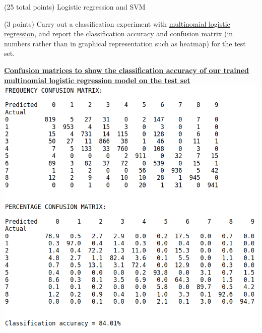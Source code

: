 \documentclass[12pt]{article}
\begin{document}
\begin{question}{(25 total points) Logistic regression and SVM}

  


  \medskip
   \begin{subquestion}{(3 points)
       Carry out a classification experiment with
       \href{https://scikit-learn.org/0.19/modules/generated/sklearn.linear\_model.LogisticRegression.html}{multinomial logistic regression},
       and report the classification accuracy and confusion matrix (in
       numbers rather than in graphical representation such as heatmap)
       for the test set.
     } \label{Q2.1}


   

      \begin{answerbox}{40em}
        \begin{center}
        \textbf{\underline{Confusion matrices to show the classification accuracy of our trained}}\\
        \textbf{\underline{multinomial logistic regression model on the test set}}
        \vspace{0.3cm}\\
         \includegraphics[width=1\textwidth]{images/q21.png}
        \end{center}
      \end{answerbox}
  



\end{subquestion}
\end{question}
\end{document}
